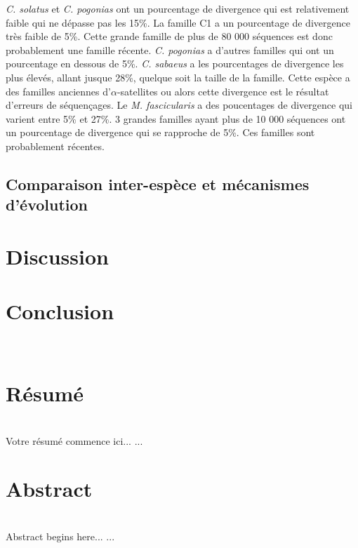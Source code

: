 \documentclass[12pt,a4paper]{article}
\begin{document}
	\textit{C. solatus} et \textit{C. pogonias} ont un pourcentage de divergence qui est relativement faible qui ne dépasse pas les 15\%. La  famille C1 a un pourcentage de divergence très faible de 5\%. Cette grande famille de plus de 80 000 séquences est donc probablement une famille récente.  \textit{C. pogonias} a d'autres familles qui ont un pourcentage en dessous de 5\%.
	\textit{C. sabaeus} a les pourcentages de divergence les plus élevés, allant jusque 28\%, quelque soit la taille de la famille. Cette espèce a des familles anciennes d'$\alpha$-satellites ou alors cette divergence est le résultat d'erreurs de séquençages. Le \textit{M. fascicularis} a des poucentages de divergence qui varient entre 5\% et 27\%. 3 grandes familles ayant plus de 10 000 séquences ont un pourcentage de divergence qui se rapproche de 5\%. Ces familles sont probablement récentes.
	
	\subsection{Comparaison inter-espèce et mécanismes d'évolution}


\section{Discussion}
\section{Conclusion}

\newpage
\strut  ~  \mbox{}  \null
\newpage

  

%
% 
%
%
%
% 
% 

\newpage 
\thispagestyle{empty}
\section*{Résumé}~\\[0.2cm]
Votre résumé commence ici...
   ...
\section*{Abstract}~\\[0.2cm]
 Abstract begins here...
   ...
\end{document}
